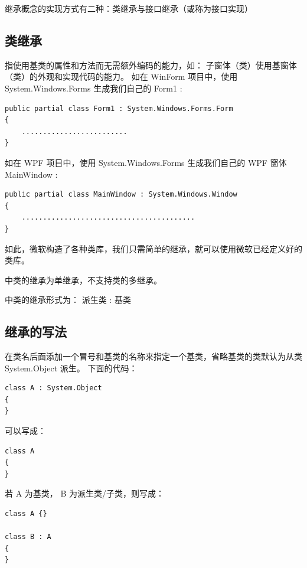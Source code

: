 继承概念的实现方式有二种：类继承与接口继承（或称为接口实现）


\subsection{ \cs 类继承}

指使用基类的属性和方法而无需额外编码的能力，如：
子窗体（类）使用基窗体（类）的外观和实现代码的能力。
如在 WinForm 项目中，使用 System.Windows.Forms 生成我们自己的 Form1 :

\begin{lstlisting}
public partial class Form1 : System.Windows.Forms.Form
{
	.........................   
}
\end{lstlisting}

如在 WPF 项目中，使用 System.Windows.Forms 生成我们自己的 WPF 窗体 MainWindow :

\begin{lstlisting}
public partial class MainWindow : System.Windows.Window
{
	.........................................
}
\end{lstlisting}

如此，微软构造了各种类库，我们只需简单的继承，就可以使用微软已经定义好的类库。

\cs 中类的继承为单继承，不支持类的多继承。

\cs 中类的继承形式为： 派生类 : 基类


\subsection{继承的写法}

在类名后面添加一个冒号和基类的名称来指定一个基类，省略基类的类默认为从类 System.Object 派生。
下面的代码：

\begin{lstlisting}
class A : System.Object
{
}
\end{lstlisting}

可以写成：

\begin{lstlisting}
class A
{
}
\end{lstlisting}

若 A 为基类， B 为派生类/子类，则写成：

\begin{lstlisting}
class A {}

class B : A
{
}
\end{lstlisting}

